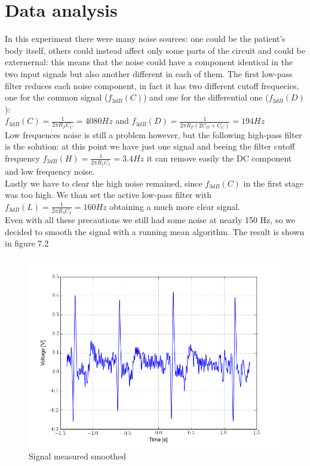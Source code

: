 \section{Data analysis}
In this experiment there were many noise sources: one could be the patient's body itself, others could instead affect only some parts of the circuit and could be externernal: this means that the noise could have a component identical in the two input signals but also another different in each of them. The first low-pass filter reduces each noise component, in fact it has two different cutoff frequecies, one for the common signal ($f_{3dB}(C)$) and one for the differential one ($f_{3dB}(D)$):\\
$f_{3dB}(C) = \frac{1}{2 \pi R_F C_C} = 4080 Hz$ and $f_{3dB}(D) = \frac{1}{2 \pi R_F (2 C_D + C_C)} = 194 Hz$\\
Low frequences noise is still a problem however, but the following high-pass filter is the solution: at this point we have just one signal and beeing the filter cutoff frequency $f_{3dB}(H) = \frac{1}{2 \pi R_1 C_1} = 3.4 Hz$ it can remove easily the DC component and low frequency noise.\\
Lastly we have to clear the high noise remained, since $f_{3dB}(C)$ in the first stage was too high. We than set the active low-pass filter with $f_{3dB}(L) = \frac{1}{2 \pi R_3 C_2} = 160 Hz$ obtaining a much more clear signal.\\
Even with all these precautions we still had some noise at nearly 150 Hz, so we decided to smooth the signal with a running mean algorithm. The result is shown in figure 7.2
\begin{figure}[H]
\centering
\includegraphics[width=.7\textwidth]{8/ecg.png}
\caption{Signal measured smoothed}
\end{figure}
